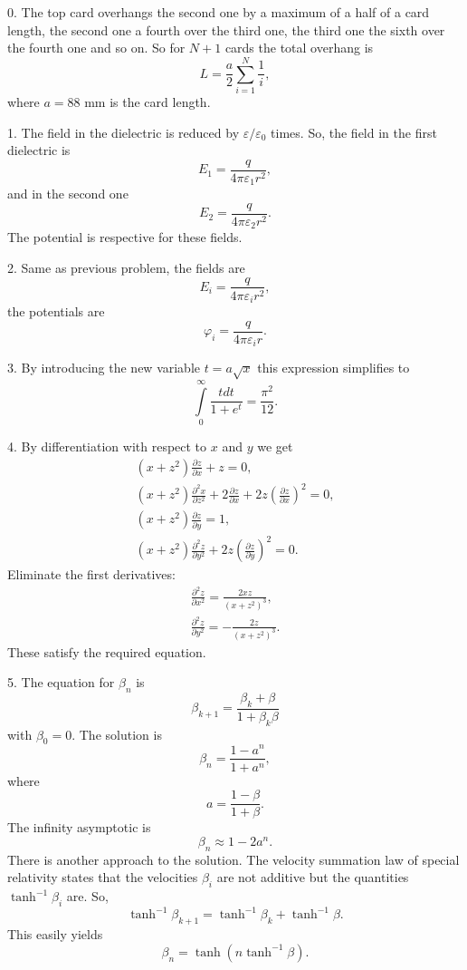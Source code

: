 \documentclass[14pt]{article}
\begin{document}
0. The top card overhangs the second one by a maximum of a half of a card length, the second one a fourth over the third one, the third one the sixth over the fourth one and so on. So for $N+1$ cards the total overhang is
$$
  L=\frac{a}{2}\sum\limits_{i=1}^N \frac{1}{i},
$$
where $a=88$ mm is the card length.

1. The field in the dielectric is reduced by $\varepsilon/\varepsilon_0$ times. So, the field in the first dielectric is
$$
  E_1=\frac{q}{4\pi\varepsilon_1 r^2},
$$
and in the second one
$$
  E_2=\frac{q}{4\pi\varepsilon_2 r^2}.
$$
The potential is respective for these fields.

2. Same as previous problem, the fields are
$$
  E_i=\frac{q}{4\pi \varepsilon_i r^2},
$$
the potentials are
$$
  \varphi_i=\frac{q}{4\pi\varepsilon_i r}.
$$

3. By introducing the new variable $t=a\sqrt{x}$ this expression simplifies to
$$
  \int\limits_0^\infty \frac{tdt}{1+e^t}=\frac{\pi^2}{12}.
$$

4. By differentiation with respect to $x$ and $y$ we get
\begin{gather}
  (x+z^2)\frac{\partial z}{\partial x}+z=0,\nonumber\\
  (x+z^2)\frac{\partial^2 x}{\partial z^2}+2\frac{\partial z}{\partial x}+2z\left(\frac{\partial z}{\partial x}\right)^2=0,\nonumber\\
  (x+z^2)\frac{\partial z}{\partial y}=1,\nonumber\\
  (x+z^2)\frac{\partial^2 z}{\partial y^2}+2z\left(\frac{\partial z}{\partial y}\right)^2=0.\nonumber
\end{gather}
Eliminate the first derivatives:
\begin{gather}
  \frac{\partial^2 z}{\partial x^2}=\frac{2xz}{\left(x+z^2\right)^3},\nonumber\\
  \frac{\partial^2 z}{\partial y^2}=-\frac{2z}{\left(x+z^2\right)^3}.\nonumber
\end{gather}
These satisfy the required equation.

5. The equation for $\beta_n$ is
$$
  \beta_{k+1}=\frac{\beta_k+\beta}{1+\beta_k \beta}
$$
with $\beta_0=0$. The solution is
$$
  \beta_n=\frac{1-a^n}{1+a^n},
$$
where
$$
  a=\frac{1-\beta}{1+\beta}.
$$
The infinity asymptotic is
$$
  \beta_n\approx 1-2a^n.
$$
There is another approach to the solution. The velocity summation law of special relativity states that the velocities $\beta_i$ are not additive but the quantities $\tanh^{-1}\beta_i$ are. So,
$$
  \tanh^{-1}\beta_{k+1}=\tanh^{-1}\beta_k+\tanh^{-1}\beta.
$$
This easily yields
$$
  \beta_n=\tanh\left(n\tanh^{-1}\beta\right).
$$
\end{document}
